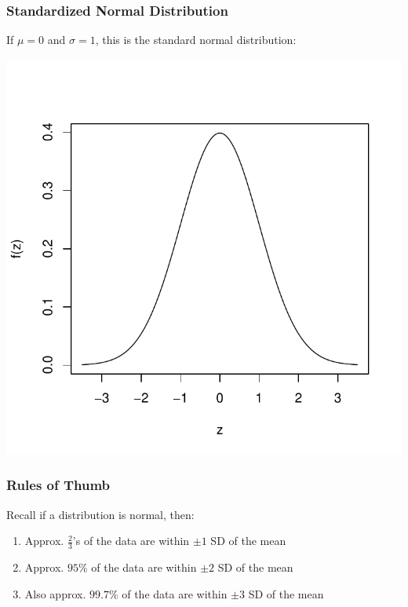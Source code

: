 \documentclass[slides]{beamer}
\newcommand{\blue}[1]{\textcolor{blue2}{#1}}
\begin{document}
\begin{frame}
\frametitle{Standardized Normal Distribution}
If $\mu=0$ and $\sigma=1$, this is the \blue{standard normal distribution}:
\begin{center}
\includegraphics{figure/standard_normal}
\end{center}
\end{frame}


\begin{frame}
\frametitle{Rules of Thumb}
Recall if a distribution is normal, then:  
\begin{enumerate}
\item Approx. $\frac{2}{3}$'s of the data are within $\pm 1$ SD of the mean
\item Approx. $95\%$ of the data are within $\pm 2$ SD of the mean
\pause\item Also approx. $99.7\%$ of the data are within $\pm 3$ SD of the mean
\end{enumerate}

\end{frame}
\end{document}

